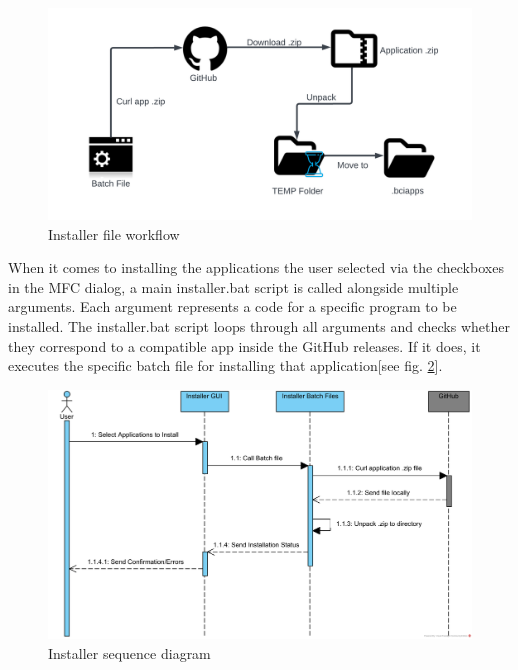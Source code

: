 \begin{figure}[H]
  \centering
  \includegraphics[width=1\textwidth]{Diagrams/Installer Workflow.png}
  \caption{Installer file workflow}
  \label{fig:installer workflow}
\end{figure}


When it comes to installing the applications the user selected via the checkboxes in the MFC dialog, a main installer.bat script is called alongside multiple arguments. Each argument represents a code for a specific program to be installed. The installer.bat script loops through all arguments and checks whether they correspond to a compatible app inside the GitHub releases. If it does, it executes the specific batch file for installing that application[see fig. \ref{fig:installer sequence diagram}].

\begin{figure}[H]
  \centering
  \includegraphics[width=1\textwidth]{Diagrams/Sequence/Installer.png}
  \caption{Installer sequence diagram}
  \label{fig:installer sequence diagram}
\end{figure}


